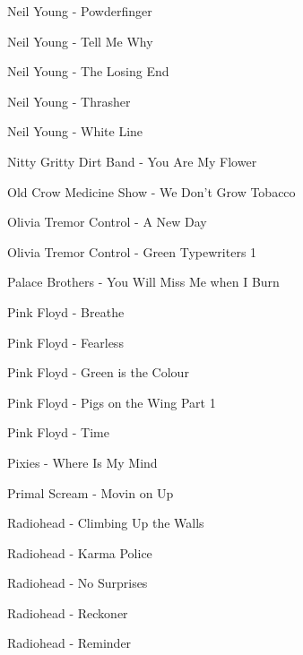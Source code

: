 Neil Young - Powderfinger \dotfill \pageref{Powderfinger - Neil Young} 

Neil Young - Tell Me Why \dotfill \pageref{Tell Me Why - Neil Young} 

Neil Young - The Losing End \dotfill \pageref{The Losing End - Neil Young} 

Neil Young - Thrasher \dotfill \pageref{Thrasher - Neil Young} 

Neil Young - White Line \dotfill \pageref{White Line - Neil Young} 

Nitty Gritty Dirt Band - You Are My Flower \dotfill \pageref{You Are My Flower - Nitty Gritty Dirt Band} 

Old Crow Medicine Show - We Don't Grow Tobacco \dotfill \pageref{We Don't Grow Tobacco - Old Crow Medicine Show} 

Olivia Tremor Control - A New Day \dotfill \pageref{A New Day - Olivia Tremor Control} 

Olivia Tremor Control - Green Typewriters 1 \dotfill \pageref{Green Typewriters 1 - Olivia Tremor Control} 

Palace Brothers - You Will Miss Me when I Burn \dotfill \pageref{You Will Miss Me when I Burn - Palace Brothers} 

Pink Floyd - Breathe \dotfill \pageref{Breathe - Pink Floyd} 

Pink Floyd - Fearless \dotfill \pageref{Fearless - Pink Floyd} 

Pink Floyd - Green is the Colour \dotfill \pageref{Green is the Colour - Pink Floyd} 

Pink Floyd - Pigs on the Wing Part 1 \dotfill \pageref{Pigs on the Wing Part 1 - Pink Floyd} 

Pink Floyd - Time \dotfill \pageref{Time - Pink Floyd} 

Pixies - Where Is My Mind \dotfill \pageref{Where Is My Mind - Pixies} 

Primal Scream - Movin on Up \dotfill \pageref{Movin on Up - Primal Scream} 

Radiohead - Climbing Up the Walls \dotfill \pageref{Climbing Up the Walls - Radiohead} 

Radiohead - Karma Police \dotfill \pageref{Karma Police - Radiohead} 

Radiohead - No Surprises \dotfill \pageref{No Surprises - Radiohead} 

Radiohead - Reckoner \dotfill \pageref{Reckoner - Radiohead} 

Radiohead - Reminder \dotfill \pageref{Reminder - Radiohead} 

